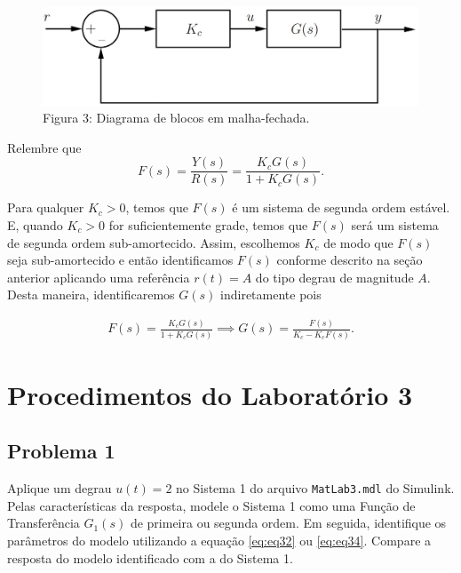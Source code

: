 \documentclass[
]{book}
\begin{document}
\begin{figure}
\centering
\includegraphics{Imagens/Lab3/Explicação/fig3.jpg}
\caption{Figura 3: Diagrama de blocos em malha-fechada.}
\end{figure}

Relembre que
\[
F(s) = \frac {Y(s)}{R(s)} = \frac {K_cG(s)}{1+K_cG(s)}.
\]

Para qualquer \(K_c > 0\), temos que \(F(s)\) é um sistema de segunda ordem estável. E, quando \(K_c > 0\) for suficientemente grade, temos que \(F(s)\) será um sistema de segunda ordem sub-amortecido. Assim, escolhemos \(K_c\) de modo que \(F(s)\) seja sub-amortecido e então identificamos \(F(s)\) conforme descrito na seção anterior aplicando uma referência \(r(t) = A\) do tipo degrau de magnitude \(A\). Desta maneira, identificaremos \(G(s)\) indiretamente pois

\begin{align}
F(s) = \frac {K_cG(s)}{1+K_cG(s)} \implies G(s) = \frac {F(s)}{K_c - K_cF(s)}.  \label{eq:eq35}
\end{align}

\hypertarget{procedimentos-do-laboratuxf3rio-3}{%
\section*{Procedimentos do Laboratório 3}\label{procedimentos-do-laboratuxf3rio-3}}

\hypertarget{problema-1}{%
\subsection*{Problema 1}\label{problema-1}}

Aplique um degrau \(u(t) = 2\) no Sistema 1 do arquivo \texttt{MatLab3.mdl} do Simulink. Pelas características da resposta, modele o Sistema 1 como uma Função de Transferência \(G_1(s)%
\) de primeira ou segunda ordem. Em seguida, identifique os parâmetros do modelo utilizando a equação \eqref{eq:eq32} ou \eqref{eq:eq34}. Compare a resposta do modelo identificado com a do Sistema 1.
\end{document}
